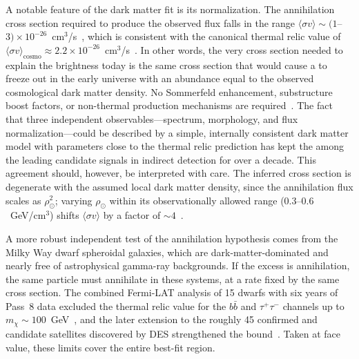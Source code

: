 A notable feature of the dark matter fit is its normalization.
The annihilation cross section required to produce the observed flux falls in the range $\langle \sigma v \rangle \sim (1$--$3) \times 10^{-26}$~cm$^3$/s~\cite{Daylan:2014rsa,Calore:2014xka}, which is consistent with the canonical thermal relic value of $\langle \sigma v \rangle_{\mathrm{cosmo}} \approx 2.2 \times 10^{-26}$~cm$^3$/s~\cite{Cirelli:2024ssz}.
In other words, the very cross section needed to explain the \GCE brightness today is the same cross section that would cause a \WIMP to freeze out in the early universe with an abundance equal to the observed cosmological dark matter density.
No Sommerfeld enhancement, substructure boost factors, or non-thermal production mechanisms are required~\cite{Daylan:2014rsa}.
The fact that three independent observables---spectrum, morphology, and flux normalization---could be described by a simple, internally consistent dark matter model with parameters close to the thermal relic prediction has kept the \GCE among the leading candidate signals in indirect detection for over a decade.
This agreement should, however, be interpreted with care.
The inferred cross section is degenerate with the assumed local dark matter density, since the annihilation flux scales as $\rho_\odot^2$; varying $\rho_\odot$ within its observationally allowed range ($0.3$--$0.6$~GeV/cm$^3$) shifts $\langle \sigma v \rangle$ by a factor of $\sim 4$~\cite{Abazajian:2014fta,Daylan:2014rsa,deSalas:2020hbh}.

A more robust independent test of the annihilation hypothesis comes from the Milky Way dwarf spheroidal galaxies, which are dark-matter-dominated and nearly free of astrophysical gamma-ray backgrounds.
If the excess is annihilation, the same particle must annihilate in these systems, at a rate fixed by the same cross section.
The combined Fermi-LAT analysis of 15 dwarfs with six years of Pass~8 data excluded the thermal relic value for the $b\bar{b}$ and $\tau^+\tau^-$ channels up to $m_\chi \sim 100$~GeV~\cite{Fermi-LAT:2015att}, and the later extension to the roughly 45 confirmed and candidate satellites discovered by DES strengthened the bound~\cite{Fermi-LAT:2016uux}.
Taken at face value, these limits cover the entire \GCE best-fit region.

